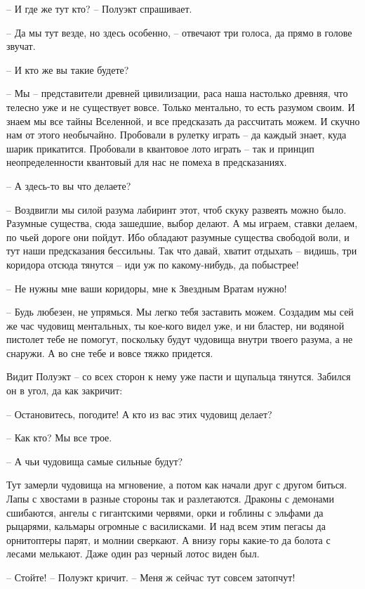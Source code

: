 \documentclass[ebook,oneside,final,openright]{memoir}
\begin{document}
– И где же тут кто? – Полуэкт спрашивает.\par
– Да мы тут везде, но здесь особенно, – отвечают три голоса, да прямо в голове звучат.\par
– И кто же вы такие будете?\par
– Мы – представители древней цивилизации, раса наша настолько древняя, что телесно уже и не существует вовсе. Только ментально, то есть разумом своим. И знаем мы все тайны Вселенной, и все предсказать да рассчитать можем. И скучно нам от этого необычайно. Пробовали в рулетку играть – да каждый знает, куда шарик прикатится. Пробовали в квантовое лото играть – так и принцип неопределенности квантовый для нас не помеха в предсказаниях.\par
– А здесь-то вы что делаете?\par
– Воздвигли мы силой разума лабиринт этот, чтоб скуку развеять можно было. Разумные существа, сюда зашедшие, выбор делают. А мы играем, ставки делаем, по чьей дороге они пойдут. Ибо обладают разумные существа свободой воли, и тут наши предсказания бессильны. Так что давай, хватит отдыхать – видишь, три коридора отсюда тянутся – иди уж по какому-нибудь, да побыстрее!\par
– Не нужны мне ваши коридоры, мне к Звездным Вратам нужно!\par
– Будь любезен, не упрямься. Мы легко тебя заставить можем. Создадим мы сей же час чудовищ ментальных, ты кое-кого видел уже, и ни бластер, ни водяной пистолет тебе не помогут, поскольку будут чудовища внутри твоего разума, а не снаружи. А во сне тебе и вовсе тяжко придется.\par
\par
Видит Полуэкт – со всех сторон к нему уже пасти и щупальца тянутся. Забился он в угол, да как закричит:\par
– Остановитесь, погодите! А кто из вас этих чудовищ делает?\par
– Как кто? Мы все трое.\par
– А чьи чудовища самые сильные будут?\par
Тут замерли чудовища на мгновение, а потом как начали друг с другом биться. Лапы с хвостами в разные стороны так и разлетаются. Драконы с демонами сшибаются, ангелы с гигантскими червями, орки и гоблины с эльфами да рыцарями, кальмары огромные с василисками. И над всем этим пегасы да орнитоптеры парят, и молнии сверкают. А внизу горы какие-то да болота с лесами мелькают. Даже один раз черный лотос виден был. \par
– Стойте! – Полуэкт кричит. – Меня ж сейчас тут совсем затопчут!\par
\end{document}
